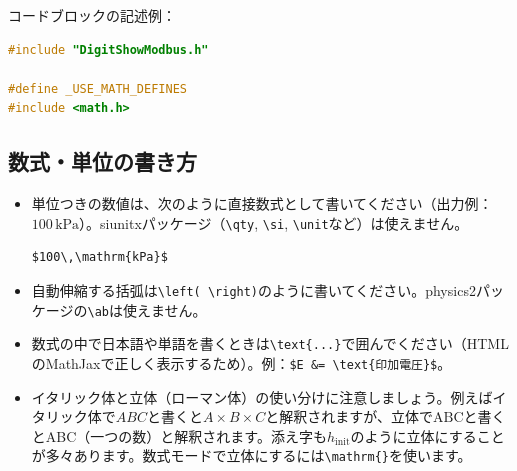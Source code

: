 コードブロックの記述例：
\begin{lstlisting}[language=C++,caption={DigitShowModbus.cpp}]
#include "DigitShowModbus.h"

#define _USE_MATH_DEFINES
#include <math.h>
\end{lstlisting}

\subsection{数式・単位の書き方}
\begin{itemize}
    \item 単位つきの数値は、次のように直接数式として書いてください（出力例：$100\,\mathrm{kPa}$）。siunitxパッケージ（\texttt{\textbackslash qty}, \texttt{\textbackslash si}, \texttt{\textbackslash unit}など）は使えません。
    \begin{lstlisting}
$100\,\mathrm{kPa}$
    \end{lstlisting}
    \item 自動伸縮する括弧は\texttt{\textbackslash left( \textbackslash right)}のように書いてください。physics2パッケージの\texttt{\textbackslash ab}は使えません。
    \item 数式の中で日本語や単語を書くときは\texttt{\textbackslash text\{...\}}で囲んでください（HTMLのMathJaxで正しく表示するため）。例：\texttt{\$E \&= \textbackslash text\{印加電圧\}\$}。
    \item イタリック体と立体（ローマン体）の使い分けに注意しましょう。例えばイタリック体で$ABC$と書くと$A\times B\times C$と解釈されますが、立体で$\mathrm{ABC}$と書くとABC（一つの数）と解釈されます。添え字も$h_\mathrm{init}$のように立体にすることが多々あります。数式モードで立体にするには\texttt{\textbackslash mathrm\{\}}を使います。
\end{itemize}

